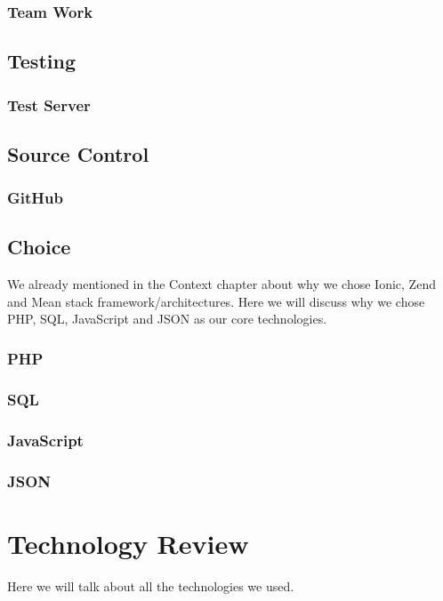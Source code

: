 \subsection{Team Work}

\section{Testing}
\subsection{Test Server}

\section{Source Control}
\subsection{GitHub}

\section{Choice}
We already mentioned in the Context chapter about why we chose Ionic, Zend and Mean stack framework/architectures.
Here we will discuss why we chose PHP, SQL, JavaScript and JSON as our core technologies.
\subsection{PHP}

\subsection{SQL}

\subsection{JavaScript}

\subsection{JSON}


\chapter{Technology Review} %
Here we will talk about all the technologies we used.

